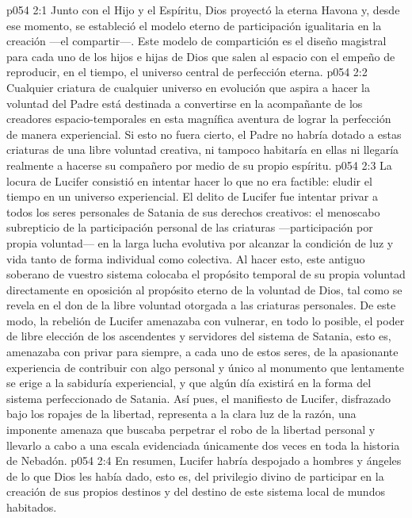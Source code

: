 \vs p054 2:1 Junto con el Hijo y el Espíritu, Dios proyectó la eterna Havona y, desde ese momento, se estableció el modelo eterno de participación igualitaria en la creación ---el compartir---. Este modelo de compartición es el diseño magistral para cada uno de los hijos e hijas de Dios que salen al espacio con el empeño de reproducir, en el tiempo, el universo central de perfección eterna.
\vs p054 2:2 Cualquier criatura de cualquier universo en evolución que aspira a hacer la voluntad del Padre está destinada a convertirse en la acompañante de los creadores espacio\hyp{}temporales en esta magnífica aventura de lograr la perfección de manera experiencial. Si esto no fuera cierto, el Padre no habría dotado a estas criaturas de una libre voluntad creativa, ni tampoco habitaría en ellas ni llegaría realmente a hacerse su compañero por medio de su propio espíritu.
\vs p054 2:3 \pc La locura de Lucifer consistió en intentar hacer lo que no era factible: eludir el tiempo en un universo experiencial. El delito de Lucifer fue intentar privar a todos los seres personales de Satania de sus derechos creativos: el menoscabo subrepticio de la participación personal de las criaturas ---participación por propia voluntad--- en la larga lucha evolutiva por alcanzar la condición de luz y vida tanto de forma individual como colectiva. Al hacer esto, este antiguo soberano de vuestro sistema colocaba el propósito temporal de su propia voluntad directamente en oposición al propósito eterno de la voluntad de Dios, tal como se revela en el don de la libre voluntad otorgada a las criaturas personales. De este modo, la rebelión de Lucifer amenazaba con vulnerar, en todo lo posible, el poder de libre elección de los ascendentes y servidores del sistema de Satania, esto es, amenazaba con privar para siempre, a cada uno de estos seres, de la apasionante experiencia de contribuir con algo personal y único al monumento que lentamente se erige a la sabiduría experiencial, y que algún día existirá en la forma del sistema perfeccionado de Satania. Así pues, el manifiesto de Lucifer, disfrazado bajo los ropajes de la libertad, representa a la clara luz de la razón, una imponente amenaza que buscaba perpetrar el robo de la libertad personal y llevarlo a cabo a una escala evidenciada únicamente dos veces en toda la historia de Nebadón.
\vs p054 2:4 En resumen, Lucifer habría despojado a hombres y ángeles de lo que Dios les había dado, esto es, del privilegio divino de participar en la creación de sus propios destinos y del destino de este sistema local de mundos habitados.
